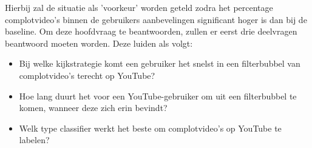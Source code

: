\documentclass[../main.tex]{subfiles}
\begin{document}
Hierbij zal de situatie als 'voorkeur' worden geteld zodra het percentage complotvideo's binnen de gebruikers aanbevelingen significant hoger is dan bij de baseline. Om deze hoofdvraag te beantwoorden, zullen er eerst drie deelvragen beantwoord moeten worden. Deze luiden als volgt:

\begin{itemize}
    \item Bij welke kijkstrategie komt een gebruiker het snelst in een filterbubbel van complotvideo's terecht op YouTube?
    \item Hoe lang duurt het voor een YouTube-gebruiker om uit een filterbubbel te komen, wanneer deze zich erin bevindt?
    \item Welk type classifier werkt het beste om complotvideo’s op YouTube te labelen?
\end{itemize}
\end{document}
